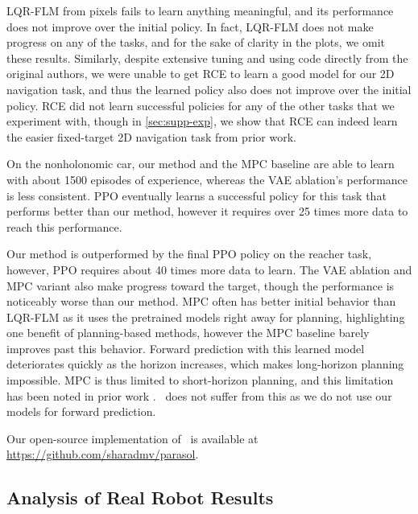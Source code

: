 LQR-FLM from pixels fails to learn anything meaningful, and its performance does not improve over the initial policy. In fact, LQR-FLM does not make progress on any of the tasks, and for the sake of clarity in the plots, we omit these results. Similarly, despite extensive tuning and using code directly from the original authors, we were unable to get RCE to learn a good model for our 2D navigation task, and thus the learned policy also does not improve over the initial policy. RCE did not learn successful policies for any of the other tasks that we experiment with, though in \autoref{sec:supp-exp}, we show that RCE can indeed learn the easier fixed-target 2D navigation task from prior work.

On the nonholonomic car, our method and the MPC baseline are able to learn with about 1500 episodes of experience, whereas the VAE ablation's performance is less consistent. PPO eventually learns a successful policy for this task that performs better than our method, however it requires over 25 times more data to reach this performance.

Our method is outperformed by the final PPO policy on the reacher task, however, PPO requires about 40 times more data to learn. The VAE ablation and MPC variant also make progress toward the target, though the performance is noticeably worse than our method. MPC often has better initial behavior than LQR-FLM as it uses the pretrained models right away for planning, highlighting one benefit of planning-based methods, however the MPC baseline barely improves past this behavior. Forward prediction with this learned model deteriorates quickly as the horizon increases, which makes long-horizon planning impossible. MPC is thus limited to short-horizon planning, and this limitation has been noted in prior work \citep{nn-dyn,mbve}. \metabbr\ does not suffer from this as we do not use our models for forward prediction.

Our open-source implementation of \metabbr\ is available at \mbox{\footnotesize{\url{https://github.com/sharadmv/parasol}}.}

\subsection{Analysis of Real Robot Results}

